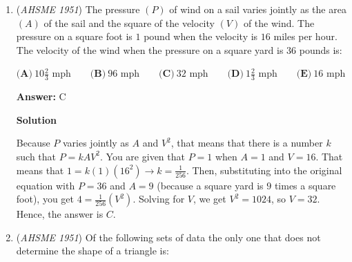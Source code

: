 \begin{enumerate}
 $\textbf{(B)}$-Since all the triangles are congruent they must always be congruent in any way.

 $\textbf{(C)}$-The triangles are all congruent meaning that they always have equal area.

 $\textbf{(D)}$-The top $2$ triangles, bottom-right $2$ triangles, and bottom-left $2$ triangles all make 3 identical congruent quadrilaterals.

 2. Gives us 3 pairs of adjacent congruent triangles, which means

 $\textbf{(E)}$ is the only choice that works.

 $\textbf{(E)}$-All of the relationships don't work so we must choose the last choice, no relations.

 3. Is not needed as we have found that all of the relationships given are not necessary all the time, so $\textbf(E)$ is the only choice that works.

 So the answer is  $\fbox{\textbf{(E)}}$



	\item (\textit{AHSME 1951}) The pressure $(P)$ of wind on a sail varies jointly as the area $(A)$ of the sail and the square of the velocity $(V)$ of the wind. The pressure on a square foot is $1$ pound when the velocity is $16$ miles per hour. The velocity of the wind when the pressure on a square yard is $36$ pounds is: 


 $\textbf{(A)}\ 10\frac{2}{3}\text{ mph}\qquad\textbf{(B)}\ 96\text{ mph}\qquad\textbf{(C)}\ 32\text{ mph}\qquad\textbf{(D)}\ 1\frac{2}{3}\text{ mph}\qquad\textbf{(E)}\ 16\text{ mph}$

 \textbf{Answer: }C



\textbf{Solution}

Because $P$ varies jointly as $A$ and $V^2$, that means that there is a number $k$ such that $P=kAV^2$. You are given that $P=1$ when $A=1$ and $V=16$. That means that $1=k(1)(16^2) \rightarrow k=\frac{1}{256}$. Then, substituting into the original equation with $P=36$ and $A=9$ (because a square yard is $9$ times a square foot), you get $4=\frac{1}{256}(V^2)$. Solving for $V$, we get $V^2=1024$, so $V=32$. Hence, the answer is $\boxed{C}$.

 


	\item (\textit{AHSME 1951}) Of the following sets of data the only one that does not determine the shape of a triangle is: 



\end{enumerate}
